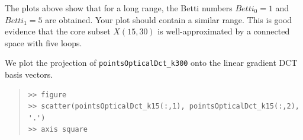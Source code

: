 \documentclass[amscd, amssymb, verbatim]{amsart}[12pt]
\theoremstyle{remark}
\theoremstyle{remark}
\theoremstyle{remark}
\begin{document}
The plots above show that for a long range, the Betti numbers $Betti_0 = 1$ and $Betti_1 = 5$ are obtained. Your plot should contain a similar range. This is good evidence that the core subset $X(15,30)$ is well-approximated by a connected space with five loops. 

We plot the projection of \texttt{pointsOpticalDct\_k300} onto the linear gradient DCT basis vectors.

\begin{quote} \begin{verbatim}
>> figure
>> scatter(pointsOpticalDct_k15(:,1), pointsOpticalDct_k15(:,2), '.')
>> axis square
\end{verbatim} \end{quote}

\begin{figure}[htp]
  \begin{center}
    \quad
   \end{center}
\end{figure}
\FloatBarrier
\end{document}
